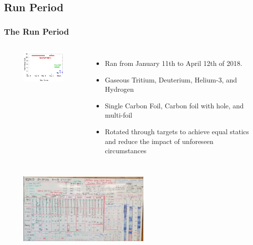 \documentclass[12pt]{beamer}
\begin{document}
\subsection[Run Period]{Run Period}
\begin{frame}
\frametitle{The Run Period}
\vspace{-20pt}
\begin{columns}
	\begin{figure}
		\includegraphics[width=4.5cm]{../images/run_per}
	\end{figure}
	\vspace{-10pt}
	\begin{itemize}
		\item Ran from January 11th to April 12th of 2018.
		\item Gaseous Tritium, Deuterium, Helium-3, and Hydrogen
		\item Single Carbon Foil, Carbon foil with hole, and multi-foil
		\item Rotated through targets to achieve equal statics and reduce the impact of unforeseen circumstances
	\end{itemize}
\end{columns}
\begin{figure}
	\includegraphics[width=6.5cm]{../images/whiteboard_2_20}
\end{figure}
\end{frame}
\end{document}
